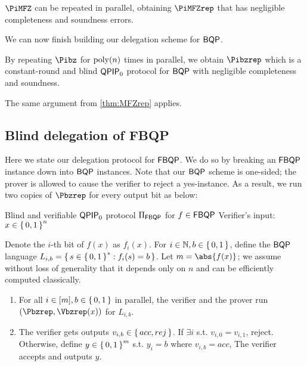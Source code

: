 \begin{thm}
	\label{thm:MFZrep}
	$\PiMFZ$ can be repeated in parallel, obtaining $\PiMFZrep$ that has negligible completeness and soundness errors.
\end{thm}

We can now finish building our delegation scheme for $\operatorname{\mathsf{BQP}}$.
\begin{thm}
	\label{thm:QPIP0BQP}
	By repeating $\Pibz$ for $\operatorname*{\operatorname{poly}}(n)$ times in parallel,
	we obtain $\Pibzrep$ which is a constant-round and blind $\operatorname{\mathsf{QPIP}}_0$ protocol for $\operatorname{\mathsf{BQP}}$ with negligible completeness and soundness.
\end{thm}
\begin{prf}
	The same argument from \cref{thm:MFZrep} applies.
\end{prf}

\subsection{Blind delegation of FBQP}
\label{subsec:BlindFBQP}

Here we state our delegation protocol for $\operatorname{\mathsf{FBQP}}$.
We do so by breaking an $\operatorname{\mathsf{FBQP}}$ instance down into $\operatorname{\mathsf{BQP}}$ instances.
Note that our $\operatorname{\mathsf{BQP}}$ scheme is one-sided; the prover is allowed to cause the verifier to reject a yes-instance.
As a result, we run two copies of $\Pbzrep$ for every output bit as below:

\begin{protocol}{Blind and verifiable $\operatorname{\mathsf{QPIP}}_0$ protocol $\Pi_{\operatorname{\mathsf{FBQP}}}$ for $f\in\operatorname{\mathsf{FBQP}}$}
	\label{proto:QPIP0FBQP}
	Verifier's input: $x\in\set{0, 1}^n$

	Denote the $i$-th bit of $f(x)$ as $f_i(x)$.
	For $i\in\mathbb{N}, b\in\set{0,1}$, define the $\operatorname{\mathsf{BQP}}$ language $L_{i, b}=\set{s\in\set{0,1}^* : f_i(s)=b}$.
	Let $m=\abs{f(x)}$; we assume without loss of generality that it depends only on $n$ and can be efficiently computed classically.
	\begin{enumerate}
		\item For all $i\in[m], b\in\set{0, 1}$ in parallel, the verifier and the prover run $(\Pbzrep, \Vbzrep(x))$ for $L_{i, b}$.
		\item The verifier gets outputs $v_{i, b}\in\set{acc, rej}$.
			If $\exists i$ s.t. $v_{i,0}=v_{i,1}$, reject.
			Otherwise, define $y\in\set{0,1}^m$ s.t. $y_i = b$ where $v_{i, b}=acc$,
			The verifier accepts and outputs $y$.
	\end{enumerate}
\end{protocol}

